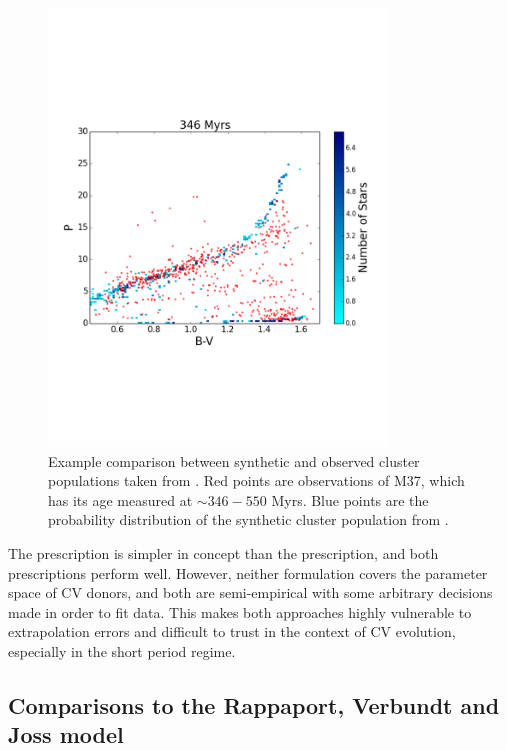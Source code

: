 \begin{figure}
    \centering
    \includegraphics[width=0.8\textwidth, trim={0 5cm 0 5cm}]{figures/introduction/garraffo2018_M37_346_hPer.pdf}
    \caption{Example comparison between synthetic and observed cluster populations taken from \citet{garraffo2018a}. Red points are observations of M37, which has its age measured at $\sim 346 - 550$ Myrs. Blue points are the probability distribution of the synthetic cluster population from \citet{garraffo2018a}.}
    \label{fig:introduction:garraffo 2018a fig 4}
\end{figure}

The \citet{garraffo2018a} prescription is simpler in concept than the \citet{matt2015} prescription, and both prescriptions perform well. However, neither formulation covers the parameter space of CV donors, and both are semi-empirical with some arbitrary decisions made in order to fit data. This makes both approaches highly vulnerable to extrapolation errors and difficult to trust in the context of CV evolution, especially in the short period regime.


\subsection{Comparisons to the Rappaport, Verbundt and Joss model}

